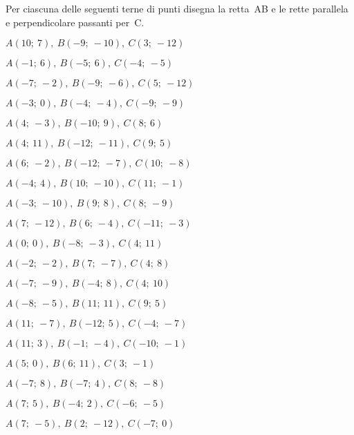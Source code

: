 \subsubsection*{}

\begin{esercizio}\label{ese:}
 Per ciascuna delle seguenti terne di 
punti disegna la retta~AB e le rette parallela e perpendicolare passanti 
per~C.
 \begin{enumeratea}
  \item  $A(10;~7),~B(-9;~-10),~C(3;~-12)$
  \item  $A(-1;~6),~B(-5;~6),~C(-4;~-5)$
  \item  $A(-7;~-2),~B(-9;~-6),~C(5;~-12)$
  \item  $A(-3;~0),~B(-4;~-4),~C(-9;~-9)$
  \item  $A(4;~-3),~B(-10;~9),~C(8;~6)$
  \item  $A(4;~11),~B(-12;~-11),~C(9;~5)$
  \item  $A(6;~-2),~B(-12;~-7),~C(10;~-8)$
  \item  $A(-4;~4),~B(10;~-10),~C(11;~-1)$
  \item  $A(-3;~-10),~B(9;~8),~C(8;~-9)$
  \item  $A(7;~-12),~B(6;~-4),~C(-11;~-3)$
  \item  $A(0;~0),~B(-8;~-3),~C(4;~11)$
  \item  $A(-2;~-2),~B(7;~-7),~C(4;~8)$
  \item  $A(-7;~-9),~B(-4;~8),~C(4;~10)$
  \item  $A(-8;~-5),~B(11;~11),~C(9;~5)$
  \item  $A(11;~-7),~B(-12;~5),~C(-4;~-7)$
  \item  $A(11;~3),~B(-1;~-4),~C(-10;~-1)$
  \item  $A(5;~0),~B(6;~11),~C(3;~-1)$
  \item  $A(-7;~8),~B(-7;~4),~C(8;~-8)$
  \item  $A(7;~5),~B(-4;~2),~C(-6;~-5)$
  \item  $A(7;~-5),~B(2;~-12),~C(-7;~0)$
 \end{enumeratea}
\end{esercizio}

\subsubsection*{}


